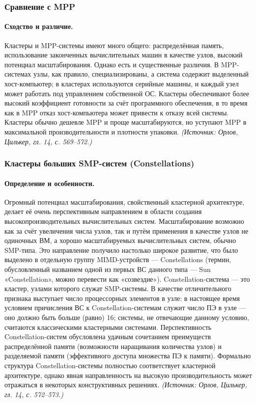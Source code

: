 \documentclass[a4paper,12pt]{article}
\begin{document}
\subsubsection{Сравнение с MPP}

\paragraph{Сходство и различие.}
Кластеры и MPP-системы имеют много общего: распределённая память, использование законченных вычислительных машин в качестве узлов, высокий потенциал масштабирования. Однако есть и существенные различия. В MPP-системах узлы, как правило, специализированы, а система содержит выделенный хост-компьютер; в кластерах используются серийные машины, и каждый узел может работать под управлением собственной ОС. Кластеры обеспечивают более высокий коэффициент готовности за счёт программного обеспечения, в то время как в MPP отказ хост-компьютера может привести к отказу всей системы. Кластеры обычно дешевле MPP и проще масштабируются, но уступают MPP в максимальной производительности и плотности упаковки.
\textit{(Источник: Орлов, Цилькер, гл. 14, с. 569--572.)}

\subsubsection{Кластеры больших SMP-систем (Constellations)}

\paragraph{Определение и особенности.}
Огромный потенциал масштабирования, свойственный кластерной архитектуре, делает её очень перспективным направлением в области создания высокопроизводительных вычислительных систем. Масштабирование возможно как за счёт увеличения числа узлов, так и путём применения в качестве узлов не одиночных ВМ, а хорошо масштабируемых вычислительных систем, обычно SMP-типа. Это направление получило настолько широкое развитие, что было выделено в отдельную группу MIMD-устройств — Constellations (термин, обусловленный названием одной из первых ВС данного типа — Sun «Constellation», можно перевести как «созвездие»). Constellation-система — это кластер, узлами которого служат SMP-системы. В качестве отличительного признака выступает число процессорных элементов в узле: в настоящее время условием причисления ВС к Constellation-системам служит число ПЭ в узле — оно должно быть больше (равно) 16; системы, не отвечающие данному условию, считаются классическими кластерными системами. Перспективность Constellation-систем обусловлена удачным сочетанием преимуществ распределённой памяти (возможности наращивания количества узлов) и разделяемой памяти (эффективного доступа множества ПЭ к памяти). Формально структура Constellation-системы полностью соответствует кластерной архитектуре, однако явная направленность на высокую производительность может отражаться в некоторых конструктивных решениях.
\textit{(Источник: Орлов, Цилькер, гл. 14, с. 572--573.)}
\end{document}
